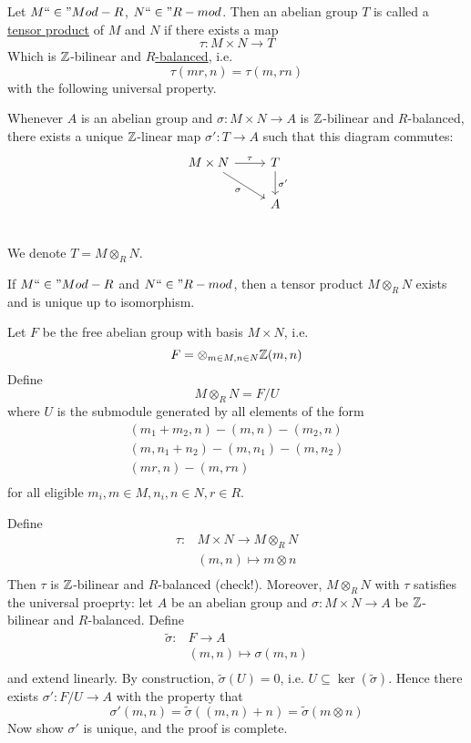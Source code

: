 \documentclass[x11names,reqno,14pt]{extarticle}
\newcommand{\fin}{``\in"}
\begin{document}

Let $M \fin Mod-R$, $N\fin R-mod$. Then an abelian group $T$ is called a \underline{tensor product} of $M$ and $N$ if there exists a map 
\[
\tau:M\times N \to T
\]
Which is $\mathbb{Z}$-bilinear and \underline{$R$-balanced}, i.e. 
\[
\tau(mr, n) = \tau(m, rn)
\]
with the following universal property. 

Whenever $A$ is an abelian group and $\sigma:M\times N \to A$ is $\mathbb{Z}$-bilinear and $R$-balanced, there exists a unique $\mathbb{Z}$-linear map $\sigma':T\to A$ such that this diagram commutes:
\[
\begin{tikzcd}
M\times N \ar[rd, "\sigma"'] \ar[r, "\tau"] & T \ar[d, "\sigma'"] \\
& A \\ 
\end{tikzcd}
\]
We denote $T = M\otimes_RN$. 

\thm If $M \fin Mod-R$ and $N\fin R-mod$, then a tensor product $M\otimes_RN$ exists and is unique up to isomorphism. 

\proof

Let $F$ be the free abelian group with basis $M\times N$, i.e.
\[
F = \otimes_{m\in M, n\in N}\mathbb{Z}(m, n)
\]
Define
\[
M\otimes_RN = F/U
\]
where $U$ is the submodule generated by all elements of the form 
\begin{align*}
(m_1 + m_2, n) - (m, n) - (m_2, n) \\
(m, n_1 + n_2) - (m, n_1) - (m, n_2) \\
(mr, n) - (m, rn) \\
\end{align*}
for all eligible $m_i, m \in M, n_i, n \in N, r \in R$. 

Define
\begin{align*}
\tau:&M\times N\to M\otimes_RN \\
&(m, n)\mapsto m\otimes n \\
\end{align*}
Then $\tau$ is $\mathbb{Z}$-bilinear and $R$-balanced (check!). Moreover, $M\otimes_RN$ with $\tau$ satisfies the universal proeprty: let $A$ be an abelian group and $\sigma:M\times N\to A$ be $\mathbb{Z}$-bilinear and $R$-balanced. Define
\begin{align*}
\tilde{\sigma}:&F\to A \\
& (m, n) \mapsto \sigma(m, n) \\
\end{align*}
and extend linearly. By construction, $\tilde{\sigma}(U) = 0$, i.e. $U \subseteq \ker(\tilde{\sigma})$. Hence there exists $\sigma':F/U\to A$ with the property that 
\[
\sigma'(m, n) = \tilde{\sigma}((m, n) + n) = \tilde{\sigma}(m\otimes n)
\]
Now show $\sigma'$ is unique, and the proof is complete. 
\end{document}
